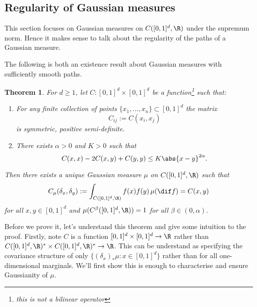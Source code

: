 \documentclass[fontsize=12pt, DIV=10]{scrreprt}
\theoremstyle{mydefn}
\newtheorem{theorem}{Theorem}
\theoremstyle{remark}
\newcommand{\defeq}{:=}
\begin{document}
\subsection{Regularity of Gaussian measures}

\newcommand{\boxspace}{\ensuremath{\R^{[0, 1]^d}}}
\newcommand{\unitbox}{\ensuremath{[0,1]^d}}
This section focuses on Gaussian measures on $C([0,1]^d, \R)$ under the supremum norm. Hence it makes sense to talk about the regularity of the paths of a Gaussian measure.

The following is both an existence result about Gaussian measures with sufficiently smooth paths.
\begin{theorem}
	\label{thm:kcc}
	For $d \geq 1$, let $C: [0, 1]^d \times [0, 1]^d$ be a function\footnote{this is not a bilinear operator} such that:
	\begin{enumerate}
		\item For any finite collection of points $\{x_1, \ldots, x_n\} \subset [0, 1]^d$ the matrix
			\begin{equation}
				C_{ij} \defeq C(x_i, x_j)
			\end{equation}
			is symmetric, positive semi-definite.
		\item There exists $\alpha > 0$ and $K > 0$ such that
			\begin{equation}
				C(x, x) - 2C(x, y) + C(y, y) \leq K \abs{x - y}^{2 \alpha}.
			\end{equation}
	\end{enumerate}
	Then there exists a unique Gaussian measure $\mu$ on $C([0, 1]^d, \R)$ such that
	\begin{equation}
		C_{\mu}(\delta_x, \delta_y) \defeq \int_{C([0, 1]^d, \R)} f(x) f(y) \, \mu(\dif f) = C(x, y)
	\end{equation}
	for all $x, y \in [0, 1]^d$ and $\mu(C^{\beta}([0, 1]^d, \R)) = 1$ for all $\beta \in (0, \alpha)$.
\end{theorem}

Before we prove it, let's understand this theorem and give some intuition to the proof. Firstly, note $C$ is a function $[0,1]^d \times [0, 1]^d \to \R$ rather than $C([0,1]^d, \R)^* \times C([0, 1]^d, \R)^* \to \R$. This can be understand as specifying the covariance structure of only $\{(\delta_x)_* \mu : x \in [0, 1]^d\}$ rather than for all one-dimensional marginals. We'll first show this is enough to characterise and ensure Gaussianity of $\mu$.
\end{document}
